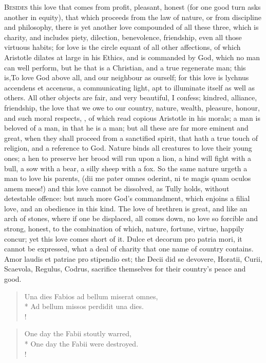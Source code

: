 {\lettrine{B}{esides} this love that comes from profit, pleasant, honest (for one
good turn asks another in equity), that which proceeds from the law of
nature, or from discipline and philosophy, there is yet another love
compounded of all these three, which is charity, and includes piety,
dilection, benevolence, friendship, even all those virtuous habits; for
love is the circle equant of all other affections, of which Aristotle
dilates at large in his Ethics, and is commanded by God, which no man
can well perform, but he that is a Christian, and a true regenerate
man; this is,To love God above all, and our neighbour as ourself;
for this love is lychnus accendens et accensus, a communicating light,
apt to illuminate itself as well as others. All other objects are fair,
and very beautiful, I confess; kindred, alliance, friendship, the love
that we owe to our country, nature, wealth, pleasure, honour, and such
moral respects, \etc{}, of which read copious Aristotle in his
morals; a man is beloved of a man, in that he is a man; but all these
are far more eminent and great, when they shall proceed from a
sanctified spirit, that hath a true touch of religion, and a reference
to God. Nature binds all creatures to love their young ones; a hen to
preserve her brood will run upon a lion, a hind will fight with a bull,
a sow with a bear, a silly sheep with a fox. So the same nature urgeth
a man to love his parents, (dii me pater omnes oderint, ni te
magis quam oculos amem meos!) and this love cannot be dissolved, as
Tully holds, without detestable offence: but much more God's
commandment, which enjoins a filial love, and an obedience in this
kind. The love of brethren is great, and like an arch of stones,
where if one be displaced, all comes down, no love so forcible and
strong, honest, to the combination of which, nature, fortune, virtue,
happily concur; yet this love comes short of it. Dulce et decorum
pro patria mori, it cannot be expressed, what a deal of charity
that one name of country contains. Amor laudis et patriae pro stipendio
est; the Decii did se devovere, Horatii, Curii, Scaevola, Regulus,
Codrus, sacrifice themselves for their country's peace and good.
%
\begin{latin}
\begin{verse}
Una dies Fabios ad bellum miserat omnes,\\*
Ad bellum missos perdidit una dies.\\!
\end{verse}
\end{latin}
\translationrule
\begin{verse}
One day the Fabii stoutly warred,\\*
One day the Fabii were destroyed.\\!
\end{verse}

}
